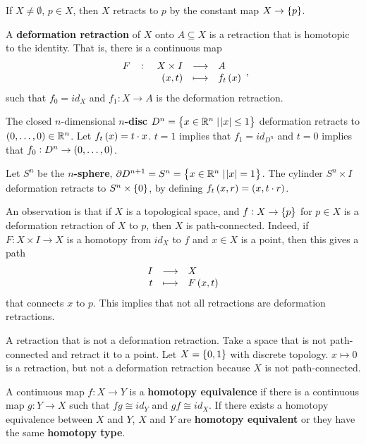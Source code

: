 \begin{example*}
If $ X \ne \emptyset $, $ p \in X $, then $ X $ retracts to $ p $ by the constant map $ X \to \cbr{p} $.
\end{example*}

\begin{definition*}
A \textbf{deformation retraction} of $ X $ onto $ A \subseteq X $ is a retraction that is homotopic to the identity. That is, there is a continuous map
$$ \function[F]{X \times I}{A}{\br{x, t}}{f_t\br{x}}, $$
such that $ f_0 = id_X $ and $ f_1 : X \to A $ is the deformation retraction.
\end{definition*}

\begin{example*}
The closed $ n $-dimensional \textbf{$ n $-disc} $ D^n = \cbr{x \in \R^n \mid \abs{x} \le 1} $ deformation retracts to $ \br{0, \dots, 0} \in \R^n $. Let $ f_t\br{x} = t \cdot x $. $ t = 1 $ implies that $ f_1 = id_{D^n} $ and $ t = 0 $ implies that $ f_0 : D^n \to \br{0, \dots, 0} $.
\end{example*}

\begin{example*}
Let $ S^n $ be the \textbf{$ n $-sphere}, $ \partial D^{n + 1} = S^n = \cbr{x \in \R^n \mid \abs{x} = 1} $. The cylinder $ S^n \times I $ deformation retracts to $ S^n \times \cbr{0} $, by defining $ f_t\br{x, r} = \br{x, t \cdot r} $.
\end{example*}

An observation is that if $ X $ is a topological space, and $ f : X \to \cbr{p} $ for $ p \in X $ is a deformation retraction of $ X $ to $ p $, then $ X $ is path-connected. Indeed, if $ F : X \times I \to X $ is a homotopy from $ id_X $ to $ f $ and $ x \in X $ is a point, then this gives a path
$$ \function{I}{X}{t}{F\br{x, t}} $$
that connects $ x $ to $ p $. This implies that not all retractions are deformation retractions.

\begin{example*}
A retraction that is not a deformation retraction. Take a space that is not path-connected and retract it to a point. Let $ X = \cbr{0, 1} $ with discrete topology. $ x \mapsto 0 $ is a retraction, but not a deformation retraction because $ X $ is not path-connected.
\end{example*}

\begin{definition*}
A continuous map $ f : X \to Y $ is a \textbf{homotopy equivalence} if there is a continuous map $ g : Y \to X $ such that $ fg \cong id_Y $ and $ gf \cong id_X $. If there exists a homotopy equivalence between $ X $ and $ Y $, $ X $ and $ Y $ are \textbf{homotopy equivalent} or they have the same \textbf{homotopy type}.
\end{definition*}

